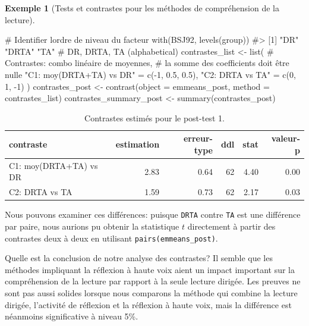 \documentclass[
  11pt,
  letterpaper,
]{scrbook}
\newenvironment{Shaded}{\begin{snugshade}}{\end{snugshade}}
\newcommand{\AttributeTok}[1]{\textcolor[rgb]{0.40,0.45,0.13}{#1}}
\newcommand{\CommentTok}[1]{\textcolor[rgb]{0.37,0.37,0.37}{#1}}
\newcommand{\DecValTok}[1]{\textcolor[rgb]{0.68,0.00,0.00}{#1}}
\newcommand{\FloatTok}[1]{\textcolor[rgb]{0.68,0.00,0.00}{#1}}
\newcommand{\FunctionTok}[1]{\textcolor[rgb]{0.28,0.35,0.67}{#1}}
\newcommand{\NormalTok}[1]{\textcolor[rgb]{0.00,0.23,0.31}{#1}}
\newcommand{\OtherTok}[1]{\textcolor[rgb]{0.00,0.23,0.31}{#1}}
\newcommand{\SpecialCharTok}[1]{\textcolor[rgb]{0.37,0.37,0.37}{#1}}
\newcommand{\StringTok}[1]{\textcolor[rgb]{0.13,0.47,0.30}{#1}}
\theoremstyle{plain}
\theoremstyle{plain}
\theoremstyle{definition}
\newtheorem{example}{Exemple}[chapter]
\theoremstyle{definition}
\theoremstyle{remark}
\begin{document}
\begin{example}[Tests et contrastes pour les méthodes de compréhension
de la
lecture]
\begin{Shaded}
\begin{Highlighting}[]
\CommentTok{\# Identifier l\textquotesingle{}ordre de niveau du facteur}
\FunctionTok{with}\NormalTok{(BSJ92, }\FunctionTok{levels}\NormalTok{(group))}
\CommentTok{\#\textgreater{} [1] "DR"   "DRTA" "TA"}
\CommentTok{\# DR, DRTA, TA (alphabetical)}
\NormalTok{contrastes\_list }\OtherTok{\textless{}{-}} \FunctionTok{list}\NormalTok{(}
  \CommentTok{\# Contrastes: combo linéaire de moyennes,}
  \CommentTok{\# la somme des coefficients doit être nulle}
  \StringTok{"C1: moy(DRTA+TA) vs DR"} \OtherTok{=} \FunctionTok{c}\NormalTok{(}\SpecialCharTok{{-}}\DecValTok{1}\NormalTok{, }\FloatTok{0.5}\NormalTok{, }\FloatTok{0.5}\NormalTok{),}
  \StringTok{"C2: DRTA vs TA"} \OtherTok{=} \FunctionTok{c}\NormalTok{(}\DecValTok{0}\NormalTok{, }\DecValTok{1}\NormalTok{, }\SpecialCharTok{{-}}\DecValTok{1}\NormalTok{)}
\NormalTok{)}
\NormalTok{contrastes\_post }\OtherTok{\textless{}{-}}
  \FunctionTok{contrast}\NormalTok{(}\AttributeTok{object =}\NormalTok{ emmeans\_post,}
           \AttributeTok{method =}\NormalTok{ contrastes\_list)}
\NormalTok{contrastes\_summary\_post }\OtherTok{\textless{}{-}} \FunctionTok{summary}\NormalTok{(contrastes\_post)}
\end{Highlighting}
\end{Shaded}

\begin{longtable}[t]{lrrrrr}

\caption{\label{tbl-print-contrasts}Contrastes estimés pour le post-test
1.}

\tabularnewline

\toprule
contraste & estimation & erreur-type & ddl & stat & valeur-p\\
\midrule
C1: moy(DRTA+TA) vs DR & 2.83 & 0.64 & 62 & 4.40 & 0.00\\
C2: DRTA vs TA & 1.59 & 0.73 & 62 & 2.17 & 0.03\\
\bottomrule

\end{longtable}

Nous pouvons examiner ces différences: puisque \texttt{DRTA} contre
\texttt{TA} est une différence par paire, nous aurions pu obtenir la
statistique \(t\) directement à partir des contrastes deux à deux en
utilisant \texttt{pairs(emmeans\_post)}.

Quelle est la conclusion de notre analyse des contrastes? Il semble que
les méthodes impliquant la réflexion à haute voix aient un impact
important sur la compréhension de la lecture par rapport à la seule
lecture dirigée. Les preuves ne sont pas aussi solides lorsque nous
comparons la méthode qui combine la lecture dirigée, l'activité de
réflexion et la réflexion à haute voix, mais la différence est néanmoins
significative à niveau 5\%.


\end{example}
\end{document}
